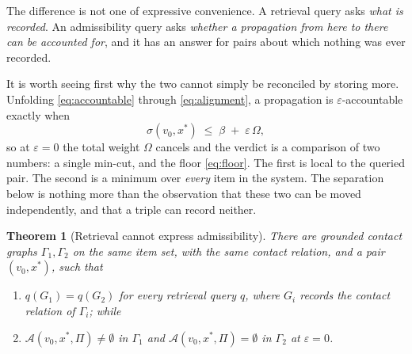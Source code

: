 \documentclass[11pt,twocolumn,a4paper]{article}
\theoremstyle{thmstyle}
\newtheorem{theorem}{Theorem}[section]
\theoremstyle{definition}
\theoremstyle{remark}
\newcommand{\Gph}{\Gamma}
\newcommand{\flo}{\beta}
\newcommand{\str}{\sigma}
\newcommand{\acc}{\mathcal{A}}
\newcommand{\Proc}{\Pi}
\newcommand{\eps}{\varepsilon}
\begin{document}
The difference is not one of expressive convenience. A retrieval query
asks \emph{what is recorded}. An admissibility query asks
\emph{whether a propagation from here to there can be accounted for},
and it has an answer for pairs about which nothing was ever recorded.

It is worth seeing first why the two cannot simply be reconciled by
storing more. Unfolding \eqref{eq:accountable} through
\eqref{eq:alignment}, a propagation is $\eps$-accountable exactly when
\begin{equation}
  \str(v_0, x^{*}) \;\leq\; \flo \;+\; \eps\,\Omega ,
  \label{eq:acc-unfolded}
\end{equation}
so at $\eps = 0$ the total weight $\Omega$ cancels and the verdict is
a comparison of two numbers: a single min-cut, and the floor
\eqref{eq:floor}. The first is local to the queried pair. The second
is a minimum over \emph{every} item in the system. The separation below
is nothing more than the observation that these two can be moved
independently, and that a triple can record neither.

\begin{theorem}[Retrieval cannot express admissibility]
\label{thm:query-separation}
There are grounded contact graphs $\Gph_1, \Gph_2$ on the same item
set, with the same contact relation, and a pair $(v_0, x^{*})$, such
that
\begin{enumerate}[label=(\roman*),leftmargin=*]
\item $q(G_1) = q(G_2)$ for every retrieval query $q$, where $G_i$
      records the contact relation of $\Gph_i$; while
\item $\acc(v_0,x^{*},\Proc) \neq \emptyset$ in $\Gph_1$ and
      $\acc(v_0,x^{*},\Proc) = \emptyset$ in $\Gph_2$ at $\eps = 0$.
\end{enumerate}
\end{theorem}
\end{document}
